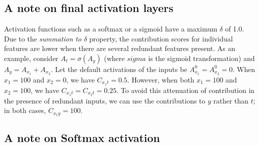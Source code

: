 \documentclass{article}
\begin{document}


\subsection{A note on final activation layers}

Activation functions such as a softmax or a sigmoid have a maximum $\delta$ of 1.0. Due to the \emph{summation to $\delta$} property, the contribution scores for individual features are lower when there are several redundant features present. As an example, consider $A_t = \sigma(A_y)$ (where $sigma$ is the sigmoid transformation) and $A_y = A_{x_1} + A_{x_2}$. Let the default activations of the inputs be $A_{x_1}^0 = A_{x_2}^0 = 0$. When $x_1 = 100$ and $x_2 = 0$, we have $C_{x_1 t} = 0.5$. However, when both $x_1 = 100$ and $x_2 = 100$, we have $C_{x_1 t} = C_{x_2 t} = 0.25$. To avoid this attenuation of contribution in the presence of redundant inputs, we can use the contributions to $y$ rather than $t$; in both cases, $C_{x_1 y} = 100$.

\subsection{A note on Softmax activation}
\end{document}
